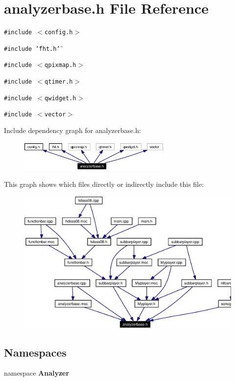 \section{analyzerbase.h File Reference}
\label{analyzerbase_8h}


{\tt \#include $<$config.h$>$}\par
{\tt \#include \char`\"{}fht.h\char`\"{}}\par
{\tt \#include $<$qpixmap.h$>$}\par
{\tt \#include $<$qtimer.h$>$}\par
{\tt \#include $<$qwidget.h$>$}\par
{\tt \#include $<$vector$>$}\par


Include dependency graph for analyzerbase.h:\begin{figure}[H]
\begin{center}
\leavevmode
\includegraphics[width=215pt]{analyzerbase_8h__incl}
\end{center}
\end{figure}


This graph shows which files directly or indirectly include this file:\begin{figure}[H]
\begin{center}
\leavevmode
\includegraphics[width=365pt]{analyzerbase_8h__dep__incl}
\end{center}
\end{figure}
\subsection*{Namespaces}
\begin{CompactItemize}
\item 
namespace {\bf Analyzer}
\end{CompactItemize}
